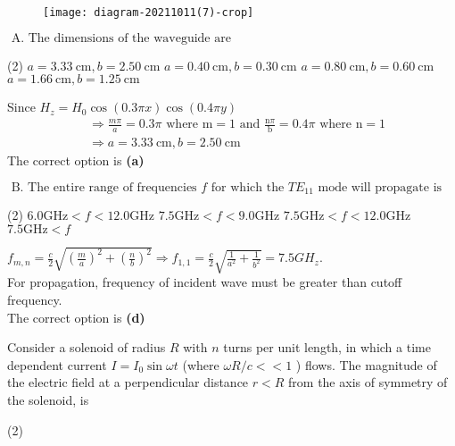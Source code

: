 \begin{enumerate}
\begin{minipage}{\textwidth}
\begin{figure}[H]
		\texttt{[image: diagram-20211011(7)-crop]}
		\caption{}
		\label{}
	\end{figure}
\end{minipage}
$\text { A. The dimensions of the waveguide are }$
\begin{tasks}(2)
	\task[\textbf{A.}] $a=3.33 \mathrm{~cm}, b=2.50 \mathrm{~cm}$
	\task[\textbf{B.}]$a=0.40 \mathrm{~cm}, b=0.30 \mathrm{~cm}$
	\task[\textbf{C.}]$a=0.80 \mathrm{~cm}, b=0.60 \mathrm{~cm}$
	\task[\textbf{D.}] $a=1.66 \mathrm{~cm}, b=1.25 \mathrm{~cm}$
\end{tasks}
\begin{answer}
	Since $H_{z}=H_{0} \cos (0.3 \pi x) \cos (0.4 \pi y)$
	$$
	\begin{aligned}
	&\Rightarrow \frac{m \pi}{a}=0.3 \pi \text { where } \mathrm{m}=1 \text { and } \frac{\mathrm{n} \pi}{\mathrm{b}}=0.4 \pi \text { where } \mathrm{n}=1 \\
	&\Rightarrow a=3.33 \mathrm{~cm}, b=2.50 \mathrm{~cm}
	\end{aligned}
	$$
	The correct option is \textbf{(a)}
\end{answer}
$\text { B. The entire range of frequencies } f \text { for which the } T E_{11} \text { mode will propagate is }$
\begin{tasks}(2)
	\task[\textbf{A.}]  $6.0 \mathrm{GHz}<f<12.0 \mathrm{GHz}$
	\task[\textbf{B.}]$7.5 \mathrm{GHz}<f<9.0 \mathrm{GHz}$
	\task[\textbf{C.}]$7.5 \mathrm{GHz}<f<12.0 \mathrm{GHz}$
	\task[\textbf{D.}]  $7.5 \mathrm{GHz}<f$
\end{tasks}
\begin{answer}
	$f_{m, n}=\frac{c}{2} \sqrt{\left(\frac{m}{a}\right)^{2}+\left(\frac{n}{b}\right)^{2}} \Rightarrow f_{1,1}=\frac{c}{2} \sqrt{\frac{1}{a^{2}}+\frac{1}{b^{2}}}=7.5 G H_{z}$.\\
	For propagation, frequency of incident wave must be greater than cutoff frequency.\\
	The correct option is \textbf{(d)}
\end{answer}
\begin{minipage}{\textwidth}
	\item Consider a solenoid of radius $R$ with $n$ turns per unit length, in which a time dependent current $I=I_{0} \sin \omega t$ (where $\omega R / c<<1$ ) flows. The magnitude of the electric field at a perpendicular distance $r<R$ from the axis of symmetry of the solenoid, is
\end{minipage}
\begin{tasks}(2)

\end{tasks}
\end{enumerate}
